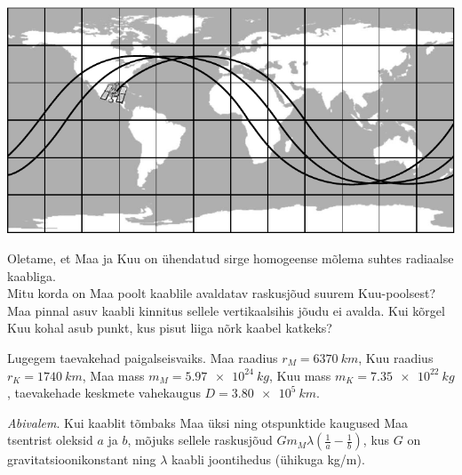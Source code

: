\documentclass[10pt, twoside]{article}
\begin{document}
{\begin{center}
	\includegraphics[width=\linewidth]{2005-v3g-09-yl}
\end{center}
\probend
\bigskip


Oletame, et Maa ja Kuu on ühendatud sirge homogeense mõlema suhtes radiaalse kaabliga.\\
\osa Mitu korda on Maa poolt kaablile avaldatav ras\-kus\-jõud suurem
Kuu-pool\-sest?\\
\osa Maa pinnal asuv kaabli kinnitus sellele vertikaalsihis jõudu ei avalda.
Kui kõrgel Kuu kohal asub punkt, kus pisut liiga nõrk kaabel katkeks?

Lugegem taevakehad paigalseisvaiks.
Maa raadius $r_M=\SI{6370}{km}$, Kuu raadius $r_K=\SI{1740}{km}$,
Maa mass $m_M=\SI{5,97e24}{kg}$, Kuu mass $m_K=\SI{7,35e22}{kg}$, taevakehade keskmete vahekaugus $D=\SI{3,80e5}{km}$.

\emph{Abivalem}. Kui kaablit tõmbaks Maa üksi ning otspunktide kaugused Maa
tsentrist oleksid $a$ ja $b$, mõjuks sellele raskusjõud $G m_M \lambda
\left( \tfrac1a - \tfrac1b \right)$,
kus $G$ on gravitatsioonikonstant ning $\lambda$ kaabli joontihedus (ühikuga \si{kg/m}).
\probend
\newpage

\bigskip


}
\end{document}

